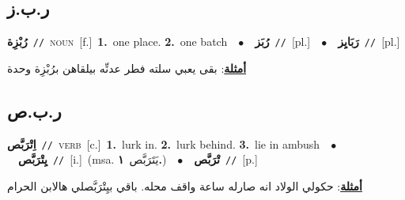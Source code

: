 \documentclass[10pt,a4paper,twoside]{article} %
\begin{document}
\begin{multicols}{2}
{{{{{{{\vspace{-3mm}
\subsection*{\color{blue}\foreignlanguage{arabic}{ر.ب.ز}\color{blue}{}} 

{\setlength\topsep{0pt}\textbf{\foreignlanguage{arabic}{رُبْزِة}}\ {\color{gray}\texttt{//}\color{black}}\ \textsc{noun}\ [f.]\ \textbf{1.}~one place.  \textbf{2.}~one batch\ \ $\bullet$\ \ \setlength\topsep{0pt}\textbf{\foreignlanguage{arabic}{رُبَز}}\ {\color{gray}\texttt{//}\color{black}}\ [pl.]\ \ $\bullet$\ \ \setlength\topsep{0pt}\textbf{\foreignlanguage{arabic}{رَبَايِز}}\ {\color{gray}\texttt{//}\color{black}}\ [pl.]\  \begin{flushright}\color{gray}\foreignlanguage{arabic}{\textbf{\underline{\foreignlanguage{arabic}{أمثلة}}}: بقى يعبي سلته فطر عدنِّه بيلقاهن برُبْزِة وحدة}\end{flushright}\color{black}} \vspace{2mm}

\vspace{-3mm}
\subsection*{\color{blue}\foreignlanguage{arabic}{ر.ب.ص}\color{blue}{}} 

{\setlength\topsep{0pt}\textbf{\foreignlanguage{arabic}{اِتْرَبَّص}}\ {\color{gray}\texttt{//}\color{black}}\ \textsc{verb}\ [c.]\ \textbf{1.}~lurk in.  \textbf{2.}~lurk behind.  \textbf{3.}~lie in ambush\ \ $\bullet$\ \ \setlength\topsep{0pt}\textbf{\foreignlanguage{arabic}{يِتْرَبَّص}}\ {\color{gray}\texttt{//}\color{black}}\ [i.]\ \color{gray}(msa. \foreignlanguage{arabic}{يَتَرَبَّص}~\foreignlanguage{arabic}{\textbf{١.}})\color{black}\ \ $\bullet$\ \ \setlength\topsep{0pt}\textbf{\foreignlanguage{arabic}{تْرَبَّص}}\ {\color{gray}\texttt{//}\color{black}}\ [p.]\  \begin{flushright}\color{gray}\foreignlanguage{arabic}{\textbf{\underline{\foreignlanguage{arabic}{أمثلة}}}: حكولي الولاد انه صارله ساعة واقف محله. باقي بيِتْرَبَّصلي هالابن الحرام}\end{flushright}\color{black}} \vspace{2mm}

}}}}}}}
\end{multicols}
\end{document}
